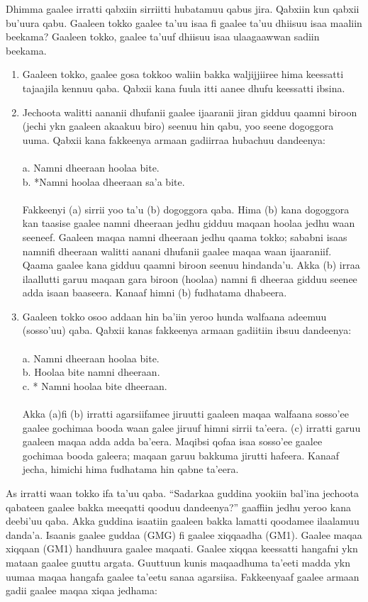 \documentclass[11pt,b5paper]{book}
\begin{document}
Dhimma gaalee irratti qabxiin sirriitti hubatamuu qabus jira. Qabxiin kun qabxii bu’uura qabu. Gaaleen tokko gaalee ta’uu isaa fi gaalee ta’uu dhiisuu isaa maaliin beekama? Gaaleen tokko, gaalee ta’uuf dhiisuu isaa ulaagaawwan sadiin beekama.
\begin{enumerate}
	\item Gaaleen tokko, gaalee gosa tokkoo waliin bakka waljijjiiree hima keessatti tajaajila kennuu qaba. Qabxii kana fuula itti aanee dhufu keessatti ibsina.
	\item Jechoota walitti aananii dhufanii gaalee ijaaranii jiran 	gidduu qaamni biroon (jechi ykn gaaleen akaakuu biro) seenuu hin qabu, yoo seene dogoggora uuma. Qabxii kana fakkeenya armaan gadiirraa hubachuu dandeenya:\\
	\\
	a. Namni dheeraan hoolaa bite.\\
	b. *Namni hoolaa dheeraan sa’a bite.\\
	\\
	Fakkeenyi (a) sirrii yoo ta’u (b) dogoggora qaba. Hima (b) kana dogoggora kan taasise gaalee namni dheeraan jedhu gidduu maqaan hoolaa jedhu waan seeneef. Gaaleen maqaa namni dheeraan jedhu qaama tokko; sababni isaas namnifi dheeraan walitti aanani dhufanii gaalee maqaa waan ijaaraniif. Qaama gaalee kana gidduu qaamni biroon seenuu hindanda’u. Akka (b) irraa ilaallutti garuu maqaan gara biroon (hoolaa) namni fi dheeraa gidduu seenee adda isaan baaseera. Kanaaf himni (b) fudhatama dhabeera.
	\item Gaaleen tokko osoo addaan hin ba’iin yeroo hunda walfaana adeemuu (sosso’uu) qaba. Qabxii kanas fakkeenya
	armaan gadiitiin ibsuu dandeenya: \\
	\\
	a. Namni dheeraan hoolaa bite.\\
	b. Hoolaa bite namni dheeraan.\\
	c. * Namni hoolaa bite dheeraan. \\
	\\
	Akka (a)fi (b) irratti agarsiifamee jiruutti gaaleen maqaa walfaana sosso’ee gaalee gochimaa booda waan galee jiruuf himni sirrii ta’eera. (c) irratti garuu gaaleen maqaa adda adda ba’eera. Maqibsi qofaa isaa sosso’ee gaalee gochimaa booda galeera; maqaan garuu bakkuma jirutti hafeera. Kanaaf jecha, himichi hima fudhatama hin qabne ta’eera. 
\end{enumerate}
	
As irratti waan tokko ifa ta’uu qaba. “Sadarkaa guddina yookiin bal’ina jechoota qabateen gaalee bakka meeqatti qooduu dandeenya?” gaaffiin jedhu yeroo kana deebi’uu qaba. Akka guddina isaatiin gaaleen bakka lamatti qoodamee ilaalamuu danda’a. Isaanis gaalee guddaa (GMG) fi gaalee xiqqaadha (GM1). Gaalee maqaa xiqqaan (GM1) handhuura gaalee maqaati. Gaalee xiqqaa keessatti hangafni ykn mataan gaalee guuttu argata. Guuttuun kunis maqaadhuma ta’eeti madda ykn uumaa maqaa hangafa gaalee ta’eetu sanaa agarsiisa. Fakkeenyaaf gaalee armaan gadii gaalee maqaa xiqaa jedhama:
\end{document}

